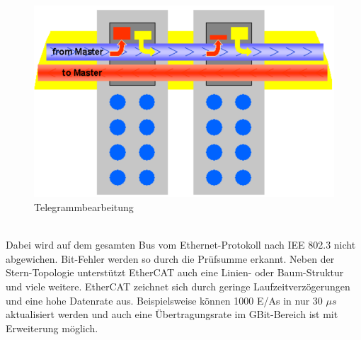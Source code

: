 \documentclass[ a4paper,
                oneside,
                toc=bibliography,
                toc=listof
                ]{scrbook}
\begin{document}
	\begin{figure}[!ht]
		\centering
		\includegraphics[width=0.7\linewidth]{./images/EtherCAT.png}
		\caption{Telegrammbearbeitung \cite{ethercat}}
		\label{fig:EtherCAT}
	\end{figure}\\
	Dabei wird auf dem gesamten Bus vom Ethernet-Protokoll nach IEE 802.3 nicht abgewichen. Bit-Fehler werden so durch die Prüfsumme erkannt. Neben der Stern-Topologie unterstützt EtherCAT auch eine Linien- oder Baum-Struktur und viele weitere.
	EtherCAT zeichnet sich durch geringe Laufzeitverzögerungen und eine hohe Datenrate aus. Beispielsweise können 1000 E/As in nur 30 \(\mu s\) aktualisiert werden und auch eine Übertragungsrate im GBit-Bereich ist mit Erweiterung möglich. \cite{ethercat}\\
	
	\clearpage
\end{document}
